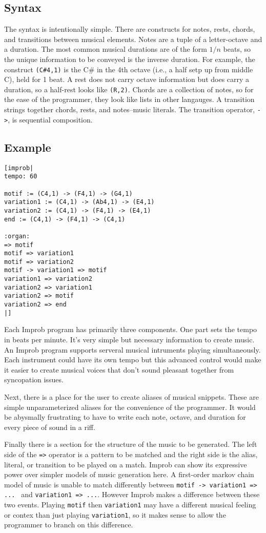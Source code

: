 \documentclass{sigplanconf-pldi15}
\begin{document}
\subsection{Syntax}
The syntax is intentionally simple. There are constructs for notes, rests, chords, and transitions between musical elements. Notes are a tuple of a letter-octave and a duration. The most common musical durations are of the form $1/n$ beats, so the unique information to be conveyed is the inverse duration. For example, the construct \texttt{(C\#4,1)} is the C\# in the 4th octave (i.e., a half setp up from middle C), held for 1 beat.
A rest does not carry octave information but does carry a duration, so a half-rest looks like \texttt{(R,2)}.
Chords are a collection of notes, so for the ease of the programmer, they look like lists in other langauges.
A transition strings together chords, rests, and notes--music literals. The transition operator, \texttt{->}, is sequential composition.

\subsection{Example}

\begin{verbatim}
[improb|
tempo: 60

motif := (C4,1) -> (F4,1) -> (G4,1)
variation1 := (C4,1) -> (Ab4,1) -> (E4,1)
variation2 := (C4,1) -> (F4,1) -> (E4,1)
end := (C4,1) -> (F4,1) -> (C4,1)

:organ:
=> motif
motif => variation1
motif => variation2
motif -> variation1 => motif
variation1 => variation2
variation2 => variation1
variation2 => motif
variation2 => end
|]
\end{verbatim}
Each Improb program has primarily three components. One part sets the tempo in beats per minute. It's very simple but necessary information to create music. An Improb program supports serveral musical intruments playing simultaneously. Each instrument could have its own tempo but this advanced control would make it easier to create musical voices that don't sound pleasant together from syncopation issues.

Next, there is a place for the user to create aliases of musical snippets. These are simple unparameterized aliases for the convenience of the programmer. It would be abysmally frustrating to have to write each note, octave, and duration for every piece of sound in a riff.

Finally there is a section for the structure of the music to be generated. The left side of the \texttt{=>} operator is a pattern to be matched and the right side is the alias, literal, or transition to be played on a match. Improb can show its expressive power over simpler models of music generation here. A first-order markov chain model of music is unable to match differently between \texttt{motif -> variation1 => ... } and \texttt{variation1 => ...}. However Improb makes a difference between these two events. Playing \texttt{motif} then \texttt{variation1} may have a different musical feeling or contex than just playing \texttt{variation1}, so it makes sense to allow the programmer to branch on this difference.
\end{document}
